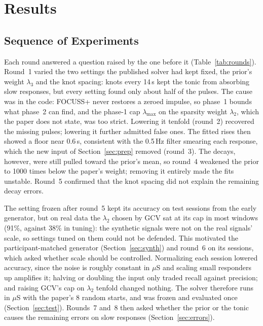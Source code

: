 \documentclass[conference]{IEEEtran}
\begin{document}
\section{Results}\label{sec:results}

\subsection{Sequence of Experiments}
Each round answered a question raised by the one before it (Table~\ref{tab:rounds}). Round~1
varied the two settings the published solver had kept fixed, the prior's weight $\lambda_3$ and the knot
spacing: knots every 14\,s kept the tonic from absorbing slow responses, but every setting found
only about half of the pulses. The cause was in the code: FOCUSS+ never restores a zeroed impulse,
so phase~1 bounds what phase~2 can find, and the phase-1 cap $\lambda_{\max}$ on the sparsity
weight $\lambda_2$, which the paper does not state, was too strict. Lowering it tenfold (round~2) recovered the missing pulses; lowering it
further admitted false ones. The fitted rises then showed a floor near 0.6\,s, consistent with the
0.5\,Hz filter smearing each response, which the new input of Section~\ref{sec:prep} removed
(round~3). The decays, however, were still pulled toward the prior's mean, so round~4 weakened the
prior to 1000 times below the paper's weight; removing it entirely made the fits unstable.
Round~5 confirmed that the knot spacing did not explain the remaining decay errors.

The setting frozen after round~5 kept its accuracy on test sessions from the early generator, but
on real data the $\lambda_2$ chosen by GCV sat at its cap in most windows (91\%, against 38\% in
tuning): the synthetic signals were not on the real signals' scale, so settings tuned on them could
not be defended. This motivated the participant-matched generator (Section~\ref{sec:synth}) and
round~6 on its sessions, which asked whether scale should be controlled. Normalizing each session
lowered accuracy, since the noise is roughly constant in $\mu$S and scaling small responders up
amplifies it; halving or doubling the input only traded recall against precision; and raising
GCV's cap on $\lambda_2$ tenfold changed nothing. The solver therefore runs in $\mu$S with the paper's 8 random starts,
and was frozen and evaluated once (Section~\ref{sec:test}). Rounds~7 and~8 then asked whether the
prior or the tonic causes the remaining errors on slow responses (Section~\ref{sec:errors}).
\end{document}
